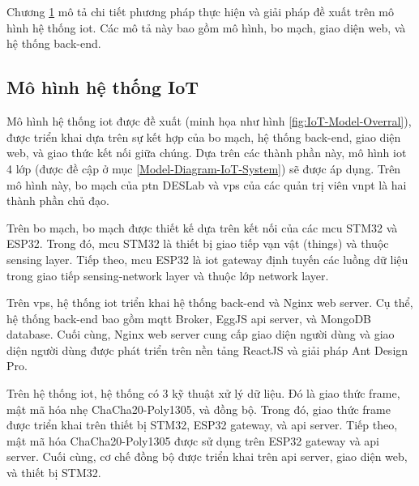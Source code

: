 \chapter{\tenKL}
\label{Chapter3}

Chương \ref{Chapter3} mô tả chi tiết phương pháp thực hiện và giải pháp đề xuất trên mô hình hệ thống \acrshort{iot}. Các mô tả này bao gồm mô hình, bo mạch, giao diện web, và hệ thống back-end.

\section{Mô hình hệ thống IoT}

Mô hình hệ thống \acrshort{iot} được đề xuất (minh họa như hình \ref{fig:IoT-Model-Overral}), được triển khai dựa trên sự kết hợp của bo mạch, hệ thống back-end, giao diện web, và giao thức kết nối giữa chúng. Dựa trên các thành phần này, mô hình \acrshort{iot} 4 lớp (được đề cập ở mục \ref{Model-Diagram-IoT-System}) sẽ được áp dụng. Trên mô hình này, bo mạch của \acrshort{ptn} DESLab và \acrshort{vps} của các quản trị viên \acrshort{vnpt} là hai thành phần chủ đạo.

Trên bo mạch, bo mạch được thiết kế dựa trên kết nối của các \acrshort{mcu} STM32 và ESP32. Trong đó, \acrshort{mcu} STM32 là thiết bị giao tiếp vạn vật (things) và thuộc sensing layer. Tiếp theo, \acrshort{mcu} ESP32 là \acrshort{iot} gateway định tuyến các luồng dữ liệu trong giao tiếp sensing-network layer và thuộc lớp network layer.

Trên \acrshort{vps}, hệ thống \acrshort{iot} triển khai hệ thống back-end và Nginx web server. Cụ thể, hệ thống back-end bao gồm \acrshort{mqtt} Broker, EggJS \acrshort{api} server, và MongoDB database. Cuối cùng, Nginx web server cung cấp giao diện người dùng và giao diện người dùng được phát triển trên nền tảng ReactJS và giải pháp Ant Design Pro.

Trên hệ thống \acrshort{iot}, hệ thống có 3 kỹ thuật xử lý dữ liệu. Đó là giao thức frame, mật mã hóa nhẹ ChaCha20-Poly1305, và đồng bộ. Trong đó, giao thức frame được triển khai trên thiết bị STM32, ESP32 gateway, và \acrshort{api} server. Tiếp theo, mật mã hóa ChaCha20-Poly1305 được sử dụng trên ESP32 gateway và \acrshort{api} server. Cuối cùng, cơ chế đồng bộ được triển khai trên \acrshort{api} server, giao diện web, và thiết bị STM32.

